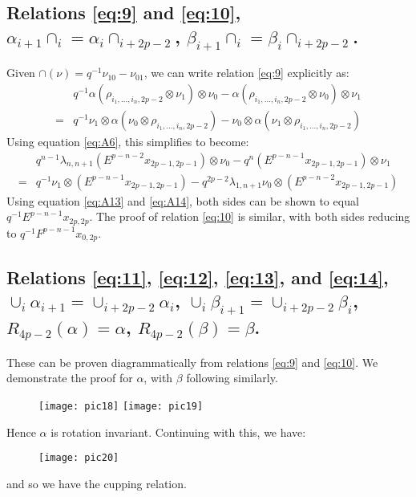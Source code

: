 \documentclass[]{article}
\begin{document}
\subsection{Relations \ref{eq:9} and \ref{eq:10}, $\alpha_{i+1}\cap_{i}=\alpha_{i}\cap_{i+2p-2}$, $\beta_{i+1}\cap_{i}=\beta_{i}\cap_{i+2p-2}$.}

Given $\cap(\nu)=q^{-1}\nu_{10}-\nu_{01}$, we can write relation \ref{eq:9} explicitly as:
\begin{align*}
& q^{-1}\alpha(\rho_{i_{1},...,i_{n},2p-2}\otimes\nu_{1})\otimes\nu_{0}-\alpha(\rho_{i_{1},...,i_{n},2p-2}\otimes\nu_{0})\otimes\nu_{1}\\
=& q^{-1}\nu_{1}\otimes\alpha(\nu_{0}\otimes\rho_{i_{1},...,i_{n},2p-2})-\nu_{0}\otimes\alpha(\nu_{1}\otimes\rho_{i_{1},...,i_{n},2p-2})
\end{align*}
Using equation \ref{eq:A6}, this simplifies to become:
\begin{align*}
& q^{n-1}\lambda_{n,n+1}(E^{p-n-2}x_{2p-1,2p-1})\otimes\nu_{0}-q^{n}(E^{p-n-1}x_{2p-1,2p-1})\otimes\nu_{1}\\
=& q^{-1}\nu_{1}\otimes(E^{p-n-1}x_{2p-1,2p-1})-q^{2p-2}\lambda_{1,n+1}\nu_{0}\otimes(E^{p-n-2}x_{2p-1,2p-1})
\end{align*}
Using equation \ref{eq:A13} and \ref{eq:A14}, both sides can be shown to equal $q^{-1}E^{p-n-1}x_{2p,2p}$. The proof of relation \ref{eq:10} is similar, with both sides reducing to $q^{-1}F^{p-n-1}x_{0,2p}$.


\subsection{Relations \ref{eq:11}, \ref{eq:12}, \ref{eq:13}, and \ref{eq:14}, $\cup_{i}\alpha_{i+1}=\cup_{i+2p-2}\alpha_{i}$, $\cup_{i}\beta_{i+1}=\cup_{i+2p-2}\beta_{i}$, $R_{4p-2}(\alpha)=\alpha$, $R_{4p-2}(\beta)=\beta$.}
These can be proven diagrammatically from relations \ref{eq:9} and \ref{eq:10}. We demonstrate the proof for $\alpha$, with $\beta$ following similarly.
\begin{figure}[H]
	\centering
	\texttt{[image: pic18]}
	\texttt{[image: pic19]}
\end{figure}
Hence $\alpha$ is rotation invariant. Continuing with this, we have:
\begin{figure}[H]
	\centering
	\texttt{[image: pic20]}
\end{figure}
and so we have the cupping relation.
\end{document}
